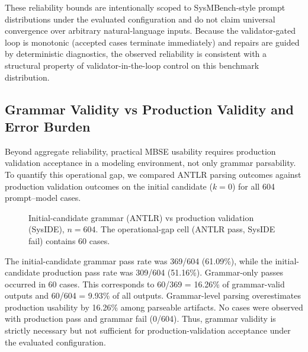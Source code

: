 These reliability bounds are intentionally scoped to SysMBench-style prompt distributions under the evaluated configuration and do not claim universal convergence over arbitrary natural-language inputs. Because the validator-gated loop is monotonic (accepted cases terminate immediately) and repairs are guided by deterministic diagnostics, the observed reliability is consistent with a structural property of validator-in-the-loop control on this benchmark distribution.

\subsection{Grammar Validity vs Production Validity and Error Burden}
Beyond aggregate reliability, practical MBSE usability requires production validation acceptance in a modeling environment, not only grammar parsability. To quantify this operational gap, we compared ANTLR parsing outcomes against production validation outcomes on the initial candidate ($k=0$) for all 604 prompt--model cases.

\begin{figure}[H]
\centering
{}
\caption{Initial-candidate grammar (ANTLR) vs production validation (SysIDE), $n=604$. The operational-gap cell (ANTLR pass, SysIDE fail) contains 60 cases.}
\label{fig:antlr_vs_production_flow}
\end{figure}

The initial-candidate grammar pass rate was 369/604 (61.09\%), while the initial-candidate production pass rate was 309/604 (51.16\%). Grammar-only passes occurred in 60 cases. This corresponds to 60/369 = 16.26\% of grammar-valid outputs and 60/604 = 9.93\% of all outputs. Grammar-level parsing overestimates production usability by 16.26\% among parseable artifacts. No cases were observed with production pass and grammar fail (0/604). Thus, grammar validity is strictly necessary but not sufficient for production-validation acceptance under the evaluated configuration.

